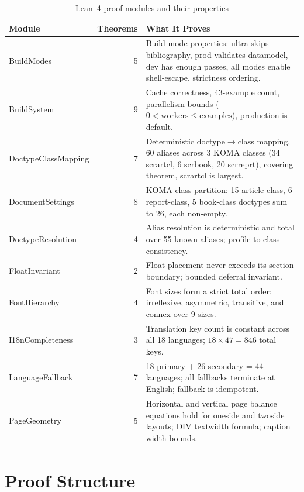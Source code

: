 \begin{table}[htbp]
  \centering
  \begin{tabular}{@{} l r p{6.5cm} @{}}
    \toprule
    \textbf{Module} & \textbf{Theorems} & \textbf{What It Proves} \\
    \midrule
    BuildModes & 5 &
      Build mode properties: ultra skips bibliography,
      prod validates datamodel, dev has enough passes,
      all modes enable shell-escape, strictness ordering. \\[3pt]
    BuildSystem & 9 &
      Cache correctness, 43-example count, parallelism bounds
      ($0 < \text{workers} \leq \text{examples}$), production is
      default. \\[3pt]
    DoctypeClassMapping & 7 &
      Deterministic doctype$\to$class mapping, 60 aliases across
      3 KOMA classes (34 scrartcl, 6 scrbook, 20 scrreprt),
      covering theorem, scrartcl is largest. \\[3pt]
    DocumentSettings & 8 &
      KOMA class partition: 15 article-class, 6 report-class,
      5 book-class doctypes sum to 26, each non-empty. \\[3pt]
    DoctypeResolution & 4 &
      Alias resolution is deterministic and total over 55 known
      aliases; profile-to-class consistency. \\[3pt]
    FloatInvariant & 2 &
      Float placement never exceeds its section boundary;
      bounded deferral invariant. \\[3pt]
    FontHierarchy & 4 &
      Font sizes form a strict total order: irreflexive, asymmetric,
      transitive, and connex over 9 sizes. \\[3pt]
    I18nCompleteness & 3 &
      Translation key count is constant across all 18 languages;
      $18 \times 47 = 846$ total keys. \\[3pt]
    LanguageFallback & 7 &
      18 primary + 26 secondary = 44 languages; all fallbacks
      terminate at English; fallback is idempotent. \\[3pt]
    PageGeometry & 5 &
      Horizontal and vertical page balance equations hold for
      oneside and twoside layouts; DIV textwidth formula;
      caption width bounds. \\
    \bottomrule
  \end{tabular}
  \caption{Lean~4 proof modules and their properties}
\end{table}

\section{Proof Structure}


